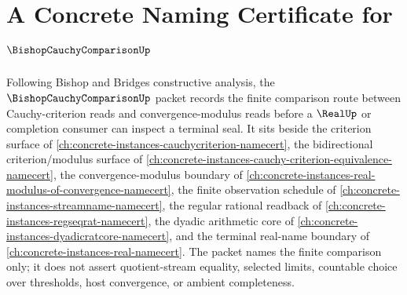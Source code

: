 \chapter{A Concrete Naming Certificate for $\BishopCauchyComparisonUp$}
\label{ch:concrete-instances-bishop-cauchy-comparison-namecert}

Following Bishop and Bridges constructive analysis, the $\BishopCauchyComparisonUp$ packet records the finite comparison route between Cauchy-criterion reads and convergence-modulus reads before a $\RealUp$ or completion consumer can inspect a terminal seal. It sits beside the criterion surface of \autoref{ch:concrete-instances-cauchycriterion-namecert}, the bidirectional criterion/modulus surface of \autoref{ch:concrete-instances-cauchy-criterion-equivalence-namecert}, the convergence-modulus boundary of \autoref{ch:concrete-instances-real-modulus-of-convergence-namecert}, the finite observation schedule of \autoref{ch:concrete-instances-streamname-namecert}, the regular rational readback of \autoref{ch:concrete-instances-regseqrat-namecert}, the dyadic arithmetic core of \autoref{ch:concrete-instances-dyadicratcore-namecert}, and the terminal real-name boundary of \autoref{ch:concrete-instances-real-namecert}. The packet names the finite comparison only; it does not assert quotient-stream equality, selected limits, countable choice over thresholds, host convergence, or ambient completeness.

